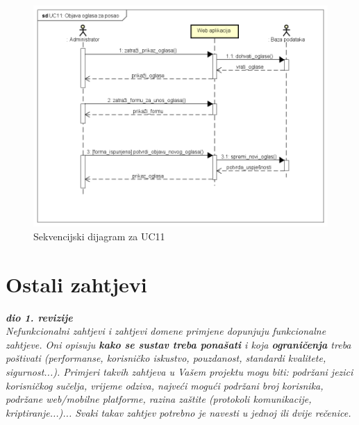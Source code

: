 \begin{figure}[H]
	\includegraphics[width=.9\linewidth]{slike/UC11_Objava_oglasa_za_posao.png}
	\centering
	\caption{Sekvencijski dijagram za UC11}
	\label{fig:skvDOglas}
\end{figure}
\eject

\section{Ostali zahtjevi}

\textbf{\textit{dio 1. revizije}}\\

\textit{Nefunkcionalni zahtjevi i zahtjevi domene primjene dopunjuju funkcionalne zahtjeve. Oni opisuju \textbf{kako se sustav treba ponašati} i koja \textbf{ograničenja} treba poštivati (performanse, korisničko iskustvo, pouzdanost, standardi kvalitete, sigurnost...). Primjeri takvih zahtjeva u Vašem projektu mogu biti: podržani jezici korisničkog sučelja, vrijeme odziva, najveći mogući podržani broj korisnika, podržane web/mobilne platforme, razina zaštite (protokoli komunikacije, kriptiranje...)... Svaki takav zahtjev potrebno je navesti u jednoj ili dvije rečenice.}


